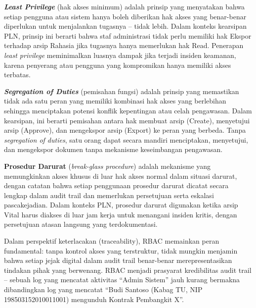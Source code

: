 \documentclass[12pt,a4paper]{report}
\begin{document}
\textbf{\textit{Least Privilege}} (hak akses minimum) adalah prinsip yang menyatakan bahwa setiap pengguna atau sistem hanya boleh diberikan hak akses yang benar-benar diperlukan untuk menjalankan tugasnya -- tidak lebih. Dalam konteks kearsipan PLN, prinsip ini berarti bahwa staf administrasi tidak perlu memiliki hak Ekspor terhadap arsip Rahasia jika tugasnya hanya memerlukan hak Read. Penerapan \textit{least privilege} meminimalkan luasnya dampak jika terjadi insiden keamanan, karena penyerang atau pengguna yang kompromikan hanya memiliki akses terbatas.

\textbf{\textit{Segregation of Duties}} (pemisahan fungsi) adalah prinsip yang memastikan tidak ada satu peran yang memiliki kombinasi hak akses yang berlebihan sehingga menciptakan potensi konflik kepentingan atau celah pengawasan. Dalam kearsipan, ini berarti pemisahan antara hak membuat arsip (Create), menyetujui arsip (Approve), dan mengekspor arsip (Export) ke peran yang berbeda. Tanpa \textit{segregation of duties}, satu orang dapat secara mandiri menciptakan, menyetujui, dan mengekspor dokumen tanpa mekanisme keseimbangan pengawasan.

\textbf{Prosedur Darurat} (\textit{break-glass procedure}) adalah mekanisme yang memungkinkan akses khusus di luar hak akses normal dalam situasi darurat, dengan catatan bahwa setiap penggunaan prosedur darurat dicatat secara lengkap dalam audit trail dan memerlukan persetujuan serta eskalasi pascakejadian. Dalam konteks PLN, prosedur darurat digunakan ketika arsip Vital harus diakses di luar jam kerja untuk menangani insiden kritis, dengan persetujuan atasan langsung yang terdokumentasi.

Dalam perspektif keterlacakan (traceability), RBAC memainkan peran fundamental: tanpa kontrol akses yang terstruktur, tidak mungkin menjamin bahwa setiap jejak digital dalam audit trail benar-benar merepresentasikan tindakan pihak yang berwenang. RBAC menjadi prasyarat kredibilitas audit trail -- sebuah log yang mencatat aktivitas ``Admin Sistem'' jauh kurang bermakna dibandingkan log yang mencatat ``Budi Santoso (Kabag TU, NIP 198503152010011001) mengunduh Kontrak Pembangkit X''.

\end{document}
